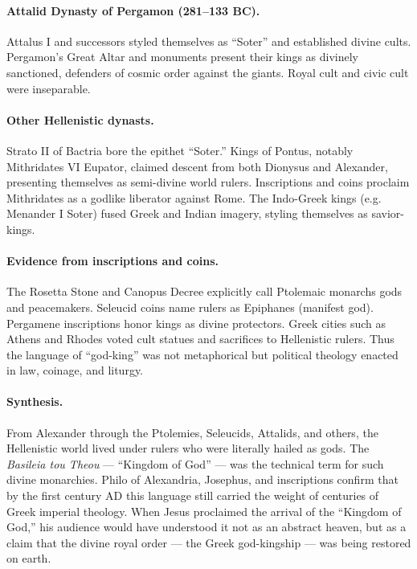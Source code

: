 \paragraph{Attalid Dynasty of Pergamon (281–133 BC).}
Attalus I and successors styled themselves as “Soter” and established divine cults.
Pergamon’s Great Altar and monuments present their kings as divinely sanctioned, defenders of cosmic order against the giants.
Royal cult and civic cult were inseparable.

\paragraph{Other Hellenistic dynasts.}
Strato II of Bactria bore the epithet “Soter.”
Kings of Pontus, notably Mithridates VI Eupator, claimed descent from both Dionysus and Alexander, presenting themselves as semi-divine world rulers.
Inscriptions and coins proclaim Mithridates as a godlike liberator against Rome.
The Indo-Greek kings (e.g. Menander I Soter) fused Greek and Indian imagery, styling themselves as savior-kings.

\paragraph{Evidence from inscriptions and coins.}
The Rosetta Stone and Canopus Decree explicitly call Ptolemaic monarchs gods and peacemakers.
Seleucid coins name rulers as Epiphanes (manifest god).
Pergamene inscriptions honor kings as divine protectors.
Greek cities such as Athens and Rhodes voted cult statues and sacrifices to Hellenistic rulers.
Thus the language of “god-king” was not metaphorical but political theology enacted in law, coinage, and liturgy.

\paragraph{Synthesis.}
From Alexander through the Ptolemies, Seleucids, Attalids, and others, the Hellenistic world lived under rulers who were literally hailed as gods.
The \textit{Basileia tou Theou} — “Kingdom of God” — was the technical term for such divine monarchies.
Philo of Alexandria, Josephus, and inscriptions confirm that by the first century AD this language still carried the weight of centuries of Greek imperial theology.
When Jesus proclaimed the arrival of the “Kingdom of God,” his audience would have understood it not as an abstract heaven, but as a claim that the divine royal order — the Greek god-kingship — was being restored on earth.

